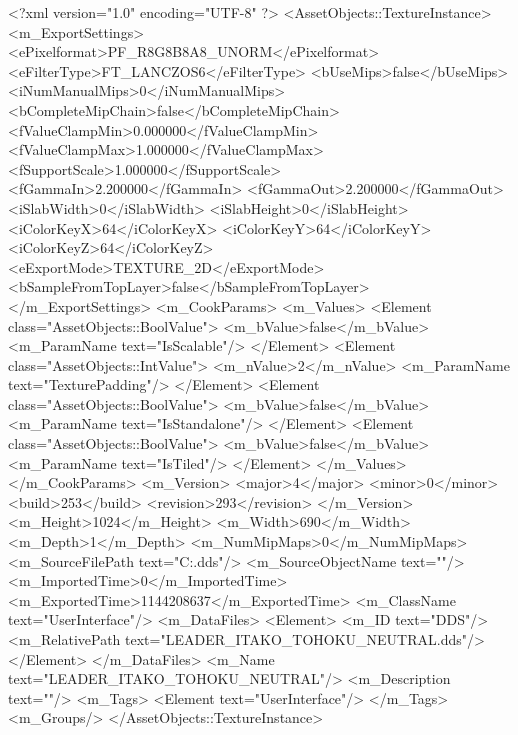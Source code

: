 <?xml version="1.0" encoding="UTF-8" ?>
<AssetObjects::TextureInstance>
	<m_ExportSettings>
		<ePixelformat>PF_R8G8B8A8_UNORM</ePixelformat>
		<eFilterType>FT_LANCZOS6</eFilterType>
		<bUseMips>false</bUseMips>
		<iNumManualMips>0</iNumManualMips>
		<bCompleteMipChain>false</bCompleteMipChain>
		<fValueClampMin>0.000000</fValueClampMin>
		<fValueClampMax>1.000000</fValueClampMax>
		<fSupportScale>1.000000</fSupportScale>
		<fGammaIn>2.200000</fGammaIn>
		<fGammaOut>2.200000</fGammaOut>
		<iSlabWidth>0</iSlabWidth>
		<iSlabHeight>0</iSlabHeight>
		<iColorKeyX>64</iColorKeyX>
		<iColorKeyY>64</iColorKeyY>
		<iColorKeyZ>64</iColorKeyZ>
		<eExportMode>TEXTURE_2D</eExportMode>
		<bSampleFromTopLayer>false</bSampleFromTopLayer>
	</m_ExportSettings>
	<m_CookParams>
		<m_Values>
			<Element class="AssetObjects::BoolValue">
				<m_bValue>false</m_bValue>
				<m_ParamName text="IsScalable"/>
			</Element>
			<Element class="AssetObjects::IntValue">
				<m_nValue>2</m_nValue>
				<m_ParamName text="TexturePadding"/>
			</Element>
			<Element class="AssetObjects::BoolValue">
				<m_bValue>false</m_bValue>
				<m_ParamName text="IsStandalone"/>
			</Element>
			<Element class="AssetObjects::BoolValue">
				<m_bValue>false</m_bValue>
				<m_ParamName text="IsTiled"/>
			</Element>
		</m_Values>
	</m_CookParams>
	<m_Version>
		<major>4</major>
		<minor>0</minor>
		<build>253</build>
		<revision>293</revision>
	</m_Version>
	<m_Height>1024</m_Height>
	<m_Width>690</m_Width>
	<m_Depth>1</m_Depth>
	<m_NumMipMaps>0</m_NumMipMaps>
	<m_SourceFilePath text="C:\Users\sseckman\Documents\Meow.dds"/>
	<m_SourceObjectName text=""/>
	<m_ImportedTime>0</m_ImportedTime>
	<m_ExportedTime>1144208637</m_ExportedTime>
	<m_ClassName text="UserInterface"/>
	<m_DataFiles>
		<Element>
			<m_ID text="DDS"/>
			<m_RelativePath text="LEADER_ITAKO_TOHOKU_NEUTRAL.dds"/>
		</Element>
	</m_DataFiles>
	<m_Name text="LEADER_ITAKO_TOHOKU_NEUTRAL"/>
	<m_Description text=""/>
	<m_Tags>
		<Element text="UserInterface"/>
	</m_Tags>
	<m_Groups/>
</AssetObjects::TextureInstance>

 